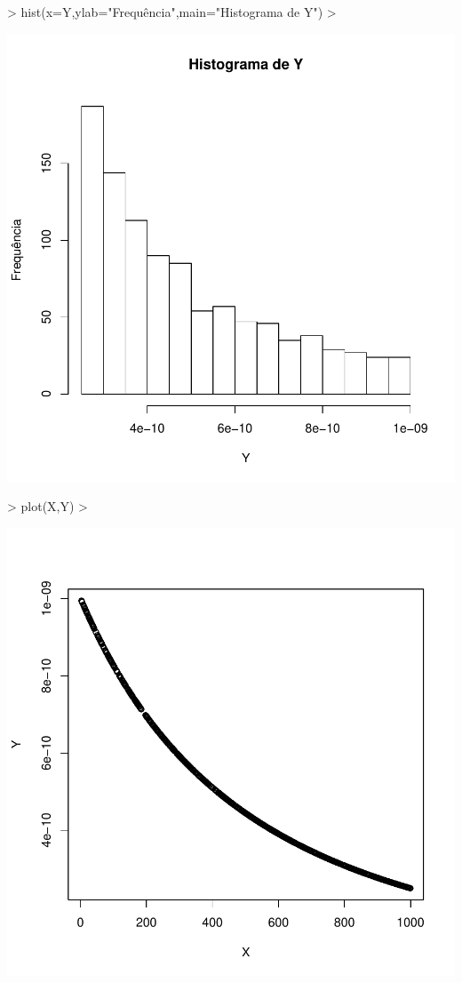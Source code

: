\documentclass{article}
\begin{document}
\begin{Schunk}
\begin{Sinput}
> hist(x=Y,ylab="Frequência",main="Histograma de Y")
> 
\end{Sinput}
\end{Schunk}
\includegraphics{transformacao-014}
\begin{Schunk}
\begin{Sinput}
> plot(X,Y)
> 
\end{Sinput}
\end{Schunk}
\includegraphics{transformacao-015}
\end{document}
